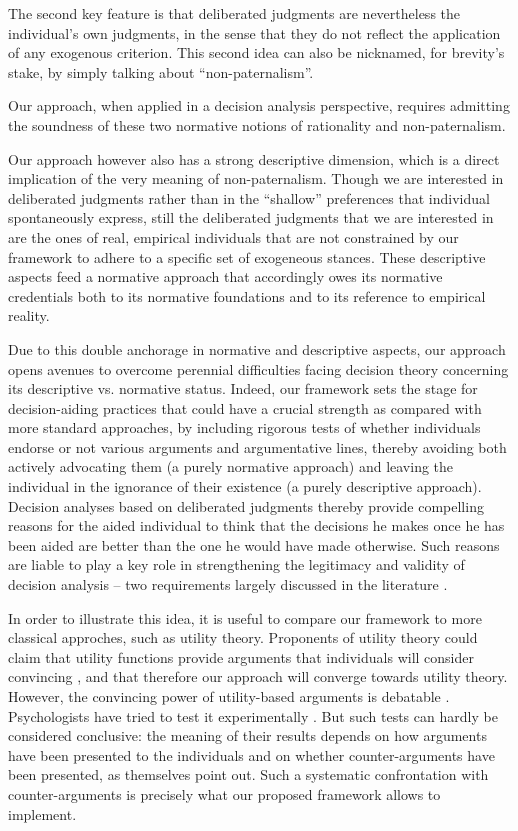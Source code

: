 \documentclass[smallextended,nospthms, natbib]{svjour3}
\begin{document}
	The second key feature is that deliberated judgments are nevertheless the individual's own judgments, in the sense that they do not reflect the application of any exogenous criterion. This second idea can also be nicknamed, for brevity's stake, by simply talking about “non-paternalism”.

Our approach, when applied in a decision analysis perspective, requires admitting the soundness of these two normative notions of rationality and non-paternalism.


Our approach however also has a strong descriptive dimension, which is a direct implication of the very meaning of non-paternalism. Though we are interested in deliberated judgments rather than in the ``shallow'' preferences that individual spontaneously express, still the deliberated judgments that we are interested in are the ones of real, empirical individuals that are not constrained by our framework to adhere to a specific set of exogeneous stances. These descriptive aspects feed a normative approach that accordingly owes its normative credentials both to its normative foundations and to its reference to empirical reality.

Due to this double anchorage in normative and descriptive aspects, our approach opens avenues to overcome perennial difficulties facing decision theory concerning its descriptive vs. normative status. Indeed, our framework sets the stage for decision-aiding practices that could have a crucial strength as compared with more standard approaches, by including rigorous tests of whether individuals endorse or not various arguments and argumentative lines, thereby avoiding both actively advocating them (a purely normative approach) and leaving the individual in the ignorance of their existence (a purely descriptive approach). Decision analyses based on deliberated judgments thereby provide compelling reasons for the aided individual to think that the decisions he makes once he has been aided are better than the one he would have made otherwise. Such reasons are liable to play a key role in strengthening the legitimacy and validity of decision analysis -- two requirements largely discussed in the literature \citep{landry_model_1983, landry_model_1996}.

In order to illustrate this idea, it is useful to compare our framework to more classical approches, such as utility theory. Proponents of utility theory could claim that utility functions provide arguments that individuals will consider convincing \citep{savage_foundations_1972, morgenstern_reflections_1979, raiffa_back_1985}, and that therefore our approach will converge towards utility theory. However, the convincing power of utility-based arguments is debatable \citep{ellsberg_risk_1961, allais_so-called_1979}. Psychologists have tried to test it experimentally \citep{slovic_who_1974, maccrimmon_utility_1979}. But such tests can hardly be considered conclusive: the meaning of their results depends on how arguments have been presented to the individuals and on whether counter-arguments have been presented, as \citet{slovic_who_1974} themselves point out. Such a systematic confrontation with counter-arguments is precisely what our proposed framework allows to implement. 
\end{document}
